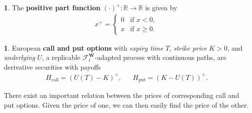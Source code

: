 \documentclass[english]{article}
\numberwithin{equation}{section}
\numberwithin{figure}{section}
\theoremstyle{bolddescit}
\theoremstyle{definition}
\newtheorem{definition}[theorem]{\protect\definitionname}
\theoremstyle{definition}
\theoremstyle{plain}
\theoremstyle{plain}
\theoremstyle{bolddesc}
\theoremstyle{plain}
\theoremstyle{remark}
\providecommand{\definitionname}{Definition}
\begin{document}
\begin{definition}
  The \textbf{positive part function} $(\cdot)^+ : \mathbb{R} \to \mathbb{R}$ is given by
  \begin{align*}
    x^+ = \left\{\begin{array}{ll}
      0 & \text{if } x < 0,\\
      x & \text{if } x \ge 0.
    \end{array}\right.
  \end{align*}
\end{definition}

\begin{definition}
  European \textbf{call and put options} with \textit{expiry time} $T$, \textit{strike price} $K > 0$, and \textit{underlying} $U$, a replicable $\mathcal{F}^\mathbf{W}_t$-adapted process with continuous paths, are derivative securities with payoffs
  \begin{align*}
    H_\text{call} = (U(T) - K)^+, && H_\text{put} = (K - U(T))^+.
  \end{align*}
\end{definition}

There exist an important relation between the prices of corresponding call and put options. Given the price of one, we can then easily find the price of the other.
\end{document}
